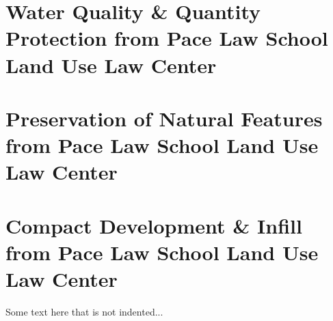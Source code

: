 \documentclass[11pt,fleqn, openany]{book} %
\begin{document}
\chapter{Water Quality \& Quantity Protection from Pace Law School Land Use Law 
Center}
\label{app:water_quality}


\chapter{Preservation of Natural Features from Pace Law School Land Use Law 
Center}
\label{app:pres_natfeatures}

\chapter{Compact Development \& Infill from Pace Law School Land Use Law 
Center} 
\label{app:compact_development}

\noindent Some text here that is not indented...



\cleardoublepage
{}
\setlength{\columnsep}{0.75cm}
\printindex

\end{document}
